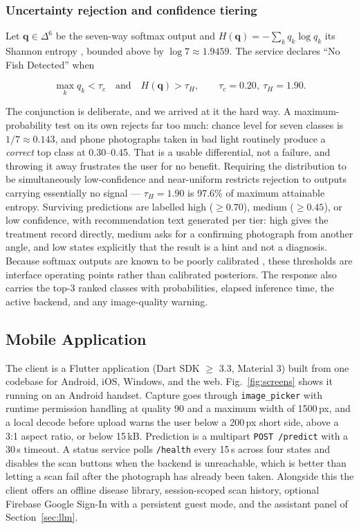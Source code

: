 \documentclass[conference]{IEEEtran}
\begin{document}
\subsubsection{Uncertainty rejection and confidence tiering}
\label{subsec:confidence}

Let $\mathbf{q}\in\Delta^{6}$ be the seven-way softmax output and $H(\mathbf{q})=-\sum_k q_k\log q_k$ its Shannon entropy \cite{b24}, bounded above by $\log 7\approx1.9459$. The service declares ``No Fish Detected'' when

\begin{equation}
\max_k q_k < \tau_c
\quad\text{and}\quad
H(\mathbf{q}) > \tau_H ,
\qquad \tau_c = 0.20,\ \tau_H = 1.90 .
\label{eq:reject}
\end{equation}

The conjunction is deliberate, and we arrived at it the hard way. A maximum-probability test on its own \cite{b25} rejects far too much: chance level for seven classes is $1/7\approx0.143$, and phone photographs taken in bad light routinely produce a \emph{correct} top class at 0.30--0.45. That is a usable differential, not a failure, and throwing it away frustrates the user for no benefit. Requiring the distribution to be simultaneously low-confidence and near-uniform restricts rejection to outputs carrying essentially no signal --- $\tau_H=1.90$ is 97.6\% of maximum attainable entropy. Surviving predictions are labelled high ($\geq0.70$), medium ($\geq0.45$), or low confidence, with recommendation text generated per tier: high gives the treatment record directly, medium asks for a confirming photograph from another angle, and low states explicitly that the result is a hint and not a diagnosis. Because softmax outputs are known to be poorly calibrated \cite{b23}, these thresholds are interface operating points rather than calibrated posteriors. The response also carries the top-3 ranked classes with probabilities, elapsed inference time, the active backend, and any image-quality warning.

\subsection{Mobile Application}
\label{subsec:mobile}

The client is a Flutter application \cite{b14} (Dart SDK $\geq$ 3.3, Material 3) built from one codebase for Android, iOS, Windows, and the web. Fig.~\ref{fig:screens} shows it running on an Android handset. Capture goes through \texttt{image\_picker} with runtime permission handling at quality 90 and a maximum width of 1500\,px, and a local decode before upload warns the user below a 200\,px short side, above a 3:1 aspect ratio, or below 15\,kB. Prediction is a multipart \texttt{POST /predict} with a 30\,s timeout. A status service polls \texttt{/health} every 15\,s across four states and disables the scan buttons when the backend is unreachable, which is better than letting a scan fail after the photograph has already been taken. Alongside this the client offers an offline disease library, session-scoped scan history, optional Firebase Google Sign-In with a persistent guest mode, and the assistant panel of Section~\ref{sec:llm}.
\end{document}
